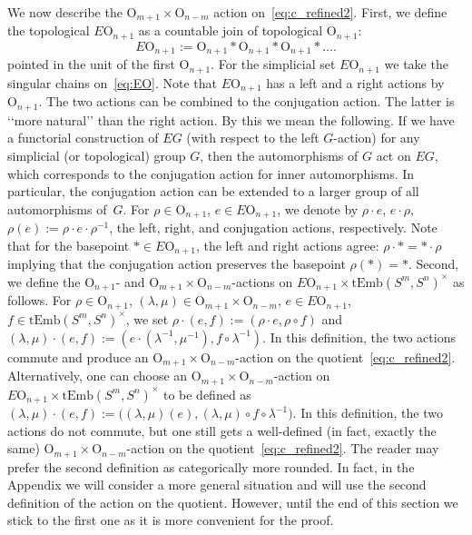 \documentclass[11pt]{amsart}
\theoremstyle{definition}
\newcommand{\tEmb}{\mathrm{tEmb}}
\newcommand{\OO}{\mathrm{O}}
\numberwithin{equation}{section}
\begin{document}
We now describe the $\OO_{m+1}{\times}\OO_{n-m}$ action on~\eqref{eq:c_refined2}.
First, we define the topological $E\OO_{n+1}$ as a countable join of topological $\OO_{n+1}$:
\begin{equation}\label{eq:EO}
E\OO_{n+1}:=\OO_{n+1}*\OO_{n+1}*\OO_{n+1}*\ldots.
\end{equation}
pointed in the unit of the first $\OO_{n+1}$. 
For the simplicial set $E\OO_{n+1}$ we take the singular chains on~\eqref{eq:EO}. Note that $E\OO_{n+1}$ has a left and a right actions by $\OO_{n+1}$. The two actions can be combined to the conjugation action. The latter
is \lq\lq{}more natural\rq\rq{} than the right action. By this we mean the following. If we have a functorial construction of $EG$ (with respect to the left $G$-action) for any simplicial (or topological) group $G$, then the  automorphisms of $G$ act on $EG$, which corresponds to the conjugation action for inner automorphisms. In particular, 
the conjugation action can be extended to a larger group of all automorphisms of~$G$. For $\rho\in\OO_{n+1}$, $e\in E\OO_{n+1}$, we denote by $\rho\cdot e$, $e\cdot\rho$, $\rho(e):=\rho\cdot e\cdot\rho^{-1}$, the left, right,
and conjugation actions, respectively. Note that for the basepoint $*\in E\OO_{n+1}$, the left and right actions agree: $\rho\cdot{*}={*}\cdot\rho$ implying that the conjugation action preserves the basepoint $\rho(*)=*$.
Second, we define the $\OO_{n+1}$- and $\OO_{m+1}\times\OO_{n-m}$-actions on $E\OO_{n+1}\times \tEmb(S^m,S^n)^\times$ as follows. For $\rho\in\OO_{n+1}$, $(\lambda,\mu)\in\OO_{m+1}\times\OO_{n-m}$,
$e\in E\OO_{n+1}$, $f\in \tEmb(S^m,S^n)^\times$, we set $\rho\cdot(e,f):=(\rho\cdot e,\rho\circ f)$ and $(\lambda,\mu)\cdot(e,f):=(e\cdot(\lambda^{-1},\mu^{-1}),f\circ\lambda^{-1})$.
In this definition, the two actions commute and produce an $\OO_{m+1}\times\OO_{n-m}$-action on the quotient~\eqref{eq:c_refined2}. Alternatively, one can choose an $\OO_{m+1}\times\OO_{n-m}$-action on $E\OO_{n+1}\times \tEmb(S^m,S^n)^\times$ to be defined as  $(\lambda,\mu)\cdot(e,f):=\bigl((\lambda,\mu)(e),(\lambda,\mu)\circ f\circ\lambda^{-1})$.
In this definition, the two actions do not commute, but one still gets a well-defined (in fact, exactly the same) $\OO_{m+1}\times\OO_{n-m}$-action on the quotient~\eqref{eq:c_refined2}. The reader may prefer
the second definition as categorically more rounded. In fact, in the Appendix we will consider a more general situation and will use the second definition of the action on the quotient. However, until the end of this section we stick to the first one as it is more convenient  for the proof.
\end{document}
